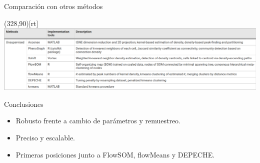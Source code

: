   \begin{frame}{Comparación con otros métodos}
  
    \makebox(328,90)[rt]{\includegraphics[scale=0.2]{images/table_methods.png}}
  
  
  
    \begin{alertblock}{Conclusiones}
      \begin{itemize}
        \item Robusto frente a cambio de parámetros y remuestreo.
        \item Preciso y escalable.
        \item Primeras posiciones junto a FlowSOM, flowMeans y DEPECHE.
      \end{itemize}
    \end{alertblock}
  
  \end{frame}
  
  
